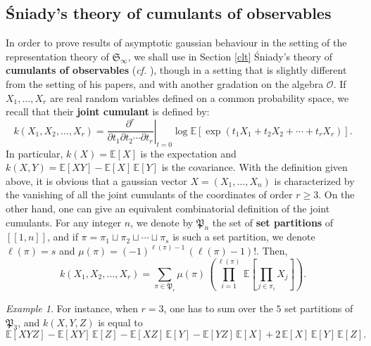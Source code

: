 \documentclass[smallextended,nospthms]{svjour3}
\theoremstyle{remark}
\newtheorem*{example}{Example}
\newcommand{\sym}{\mathfrak{S}}
\newcommand{\setpart}{\mathfrak{P}}
\newcommand{\esper}{\mathbb{E}}
\newcommand{\lle}{\left[\!\left[}
\newcommand{\rre}{\right]\!\right]}
\newcommand{\obs}{\mathscr{O}}
\begin{document}
\subsection{\'Sniady's theory of cumulants of observables}
In order to prove results of asymptotic gaussian behaviour in the setting of the representation theory of $\sym_{\infty}$, we shall use in Section \ref{clt} \'Sniady's theory of \textbf{cumulants of observables} (\emph{cf.} \cite{Sni06a,Sni06b}), though in a setting that is slightly different from the setting of his papers, and with another gradation on the algebra $\obs$. If $X_{1},\ldots,X_{r}$ are real random variables defined on a common probability space, we recall that their \textbf{joint cumulant} is defined by:
$$k(X_{1},X_{2},\ldots,X_{r})=\left.\frac{\partial^{r}}{\partial t_{1}\partial t_{2}\cdots \partial t_{r}} \right|_{t=0}\log \esper\left[\exp(t_{1}X_{1}+t_{2}X_{2}+\cdots+t_{r}X_{r})\right].$$
In particular, $k(X)=\esper [X]$ is the expectation and $k(X,Y)=\esper[XY]-\esper[X]\,\esper[Y]$ is the covariance. With the definition given above, it is obvious that a gaussian vector $X=(X_{1},\ldots,X_{n})$ is characterized by the vanishing of all the joint cumulants of the coordinates of order $r\geq 3$. On the other hand, one can give an equivalent combinatorial definition of the joint cumulants. For any integer $n$, we denote by $\setpart_{n}$ the set of \textbf{set partitions} of $\lle 1,n\rre$, and if $\pi=\pi_{1}\sqcup \pi_{2}\sqcup\cdots \sqcup \pi_{s}$ is such a set partition, we denote $\ell(\pi)=s$ and $\mu(\pi)=(-1)^{\ell(\pi)-1}\,(\ell(\pi)-1)!$. Then,
$$k(X_{1},X_{2},\ldots,X_{r})=\sum_{\pi \in \setpart_{r}} \mu(\pi) \,\left(\prod_{i=1}^{\ell(\pi)}\,\esper\!\left[\prod_{j \in \pi_{i}} X_{j}\right]\right).$$
\begin{example}
For instance, when $r=3$, one has to sum over the $5$ set partitions of $\setpart_{3}$, and $k(X,Y,Z)$ is equal to
$$\esper[XYZ]-\esper[XY]\,\esper[Z]-\esper[XZ]\,\esper[Y]-\esper[YZ]\,\esper[X]+2\,\esper[X]\,\esper[Y]\,\esper[Z].$$
\end{example}
\bigskip
\bigskip
\end{document}
